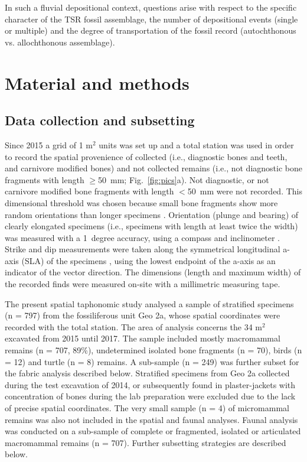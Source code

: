 \documentclass[review,times,authoryear]{elsarticle} %
\begin{document}
In such a fluvial depositional context, questions arise with respect to the specific character of the TSR fossil assemblage, the number of depositional events (single or multiple) and the degree of transportation of the fossil record (autochthonous vs. allochthonous assemblage).

\section{Material and methods}

\subsection{Data collection and subsetting}

Since 2015 a grid of 1 m$^2$ units was set up and a total station was used in order to record the spatial provenience of collected (i.e., diagnostic bones and teeth, and carnivore modified bones) and not collected remains (i.e., not diagnostic bone fragments with length $\geq$50~mm; Fig.~\ref{fig:pics}a). Not diagnostic, or not carnivore modified bone fragments with length $<$50~mm were not recorded. This dimensional threshold was chosen because small bone fragments show more random orientations than longer specimens \citep{Dominguez-Rodrigo2014}. Orientation (plunge and bearing) of clearly elongated specimens (i.e., specimens with length at least twice the width) was measured with a 1~degree accuracy, using a compass and inclinometer \citep[][among others]{Voorhies1969,Fiorillo1991,Eberth2007}. Strike and dip measurements were taken along the symmetrical longitudinal a-axis (SLA) of the specimens \citep{Dominguez-Rodrigo2013}, using the lowest endpoint of the a-axis as an indicator of the vector direction. The dimensions (length and maximum width) of the recorded finds were measured on-site with a millimetric measuring tape.

The present spatial taphonomic study analysed a sample of stratified specimens (n = 797) from the fossiliferous unit Geo 2a, whose spatial coordinates were recorded with the total station. The area of analysis concerns the 34 m$^2$ excavated from 2015 until 2017. The sample included mostly macromammal remains (n = 707, 89\%), undetermined isolated bone fragments (n = 70), birds (n = 12) and turtle (n = 8) remains. A sub-sample (n = 249) was further subset for the fabric analysis described below. Stratified specimens from Geo 2a collected during the test excavation of 2014, or subsequently found in plaster-jackets with concentration of bones during the lab preparation were excluded due to the lack of precise spatial coordinates. The very small sample (n = 4) of micromammal remains was also not included in the spatial and faunal analyses. Faunal analysis was conducted on a sub-sample of complete or fragmented, isolated or articulated macromammal remains (n = 707). Further subsetting strategies are described below.
\end{document}
